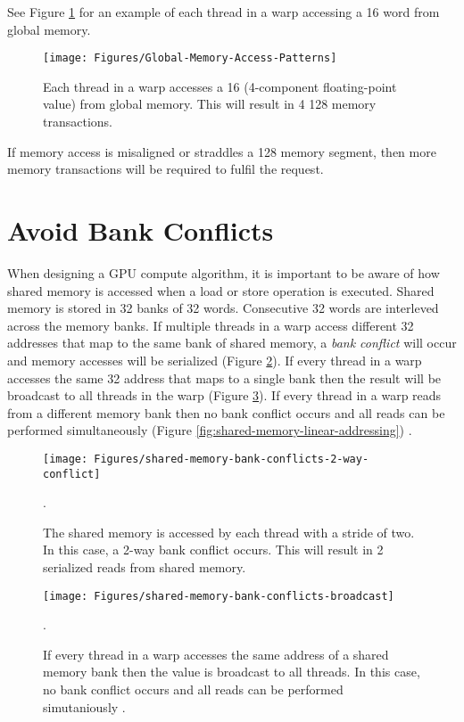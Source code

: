 See Figure \ref{fig:Global-Memory-Access-Patterns} for an example of each thread in a warp accessing a \SI{16}{\byte} word from global memory.

\begin{figure}[h]
\centering
\texttt{[image: Figures/Global-Memory-Access-Patterns]}
\decoRule
\caption{Each thread in a warp accesses a \SI{16}{\byte} (4-component floating-point value) from global memory. This will result in 4 \SI{128}{\byte} memory transactions. }
\label{fig:Global-Memory-Access-Patterns}
\end{figure}

If memory access is misaligned or straddles a \SI{128}{\byte} memory segment, then more memory transactions will be required to fulfil the request.

\section{Avoid Bank Conflicts}

When designing a GPU compute algorithm, it is important to be aware of how shared memory is accessed when a load or store operation is executed. Shared memory is stored in 32 banks of \SI{32}{\bit} words. Consecutive \SI{32}{\bit} words are interleved across the memory banks. If multiple threads in a warp access different \SI{32}{\bit} addresses that map to the same bank of shared memory, a \emph{bank conflict} will occur and memory accesses will be serialized (Figure \ref{fig:2-way_bank_conflict}). If every thread in a warp accesses the same \SI{32}{\bit} address that maps to a single bank then the result will be broadcast to all threads in the warp (Figure \ref{fig:shared-memory-broadcast}). If every thread in a warp reads from a different memory bank then no bank conflict occurs and all reads can be performed simultaneously (Figure \ref{fig:shared-memory-linear-addressing}) \parencite{26_vanoosten_2011,27_cuda_c_best_practices_guide_2016}.

\begin{figure}[H]
\centering
\texttt{[image: Figures/shared-memory-bank-conflicts-2-way-conflict]}
\decoRule
\caption{The shared memory is accessed by each thread with a stride of two. In this case, a 2-way bank conflict occurs. This will result in 2 serialized reads from shared memory.}.
\label{fig:2-way_bank_conflict}
\end{figure}

\begin{figure}[H]
\centering
\texttt{[image: Figures/shared-memory-bank-conflicts-broadcast]}
\decoRule
\caption{If every thread in a warp accesses the same address of a shared memory bank then the value is broadcast to all threads. In this case, no bank conflict occurs and all reads can be performed simutaniously \parencite{26_vanoosten_2011}.}.
\label{fig:shared-memory-broadcast}
\end{figure}

